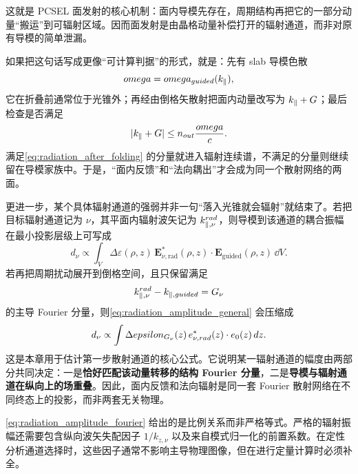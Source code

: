 这就是 PCSEL 面发射的核心机制：面内导模先存在，周期结构再把它的一部分动量“搬运”到可辐射区域。因而面发射是由晶格动量补偿打开的辐射通道，而非对原有导模的简单泄漏。

如果把这句话写成更像“可计算判据”的形式，就是：先有 slab 导模色散
\[
omega = omega_{guided}(k_\parallel),
\]
它在折叠前通常位于光锥外；再经由倒格矢散射把面内动量改写为 $k_\parallel+G$；最后检查是否满足
\begin{equation}
|k_\parallel+G| \le n_{out}\frac{omega}{c}.
\label{eq:radiation_after_folding}
\end{equation}
满足\cref{eq:radiation_after_folding} 的分量就进入辐射连续谱，不满足的分量则继续留在导模家族中。于是，“面内反馈”和“法向耦出”才会成为同一个散射网络的两面。

更进一步，某个具体辐射通道的强弱并非一句“落入光锥就会辐射”就结束了。若把目标辐射通道记为 $\nu$，其平面内辐射波矢记为 $k_{\parallel,\nu}^{rad}$，则导模到该通道的耦合振幅在最小投影层级上可写成
\begin{equation}
d_\nu
\propto
\int_V
\Delta\varepsilon(\rho,z)\,
\bm{E}^{\ast}_{\nu,\mathrm{rad}}(\rho,z)\cdot
\bm{E}_{\mathrm{guided}}(\rho,z)\,\dd V.
\label{eq:radiation_amplitude_general}
\end{equation}
若再把周期扰动展开到倒格空间，且只保留满足
\[
k_{\parallel,\nu}^{rad}-k_{\parallel,guided}=G_\nu
\]
的主导 Fourier 分量，则\cref{eq:radiation_amplitude_general} 会压缩成
\begin{equation}
d_\nu
\propto
\int
\Delta epsilon_{G_\nu}(z)\,
e^{\ast}_{\nu,rad}(z)\cdot
e_{0}(z)\,d z.
\label{eq:radiation_amplitude_fourier}
\end{equation}
这是本章用于估计第一步散射通道的核心公式。它说明某一辐射通道的幅度由两部分共同决定：一是\textbf{恰好匹配该动量转移的结构 Fourier 分量}，二是\textbf{导模与辐射通道在纵向上的场重叠}。因此，面内反馈和法向辐射是同一套 Fourier 散射网络在不同终态上的投影，而非两套无关物理。
\begin{notebox}
\cref{eq:radiation_amplitude_fourier} 给出的是比例关系而非严格等式。严格的辐射振幅还需要包含纵向波矢失配因子 $1/k_{z,\nu}$ 以及来自模式归一化的前置系数。在定性分析通道选择时，这些因子通常不影响主导物理图像，但在进行定量计算时必须补全。
\end{notebox}
